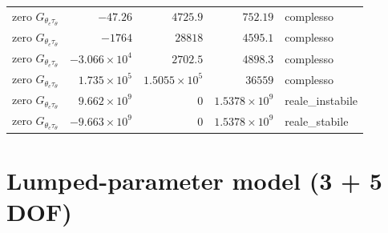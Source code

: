 \documentclass[10pt,a4paper]{article}
\numberwithin{equation}{section}
\begin{document}
\begin{longtable}{lrrrl}
zero $G_{\theta_e\tau_\theta}$ & $-47.26$ & $4725.9$ & $752.19$ & complesso \\
zero $G_{\theta_e\tau_\theta}$ & $-1764$ & $28818$ & $4595.1$ & complesso \\
zero $G_{\theta_e\tau_\theta}$ & $-3.066\times10^{4}$ & $2702.5$ & $4898.3$ & complesso \\
zero $G_{\theta_e\tau_\theta}$ & $1.735\times10^{5}$ & $1.5055\times10^{5}$ & $36559$ & complesso \\
zero $G_{\theta_e\tau_\theta}$ & $9.662\times10^{9}$ & $0$ & $1.5378\times10^{9}$ & reale\_instabile \\
zero $G_{\theta_e\tau_\theta}$ & $-9.663\times10^{9}$ & $0$ & $1.5378\times10^{9}$ & reale\_stabile \\
\bottomrule\end{longtable}
\section{Lumped-parameter model (3 + 5 DOF)}\label{sec:lumped}
\end{document}
